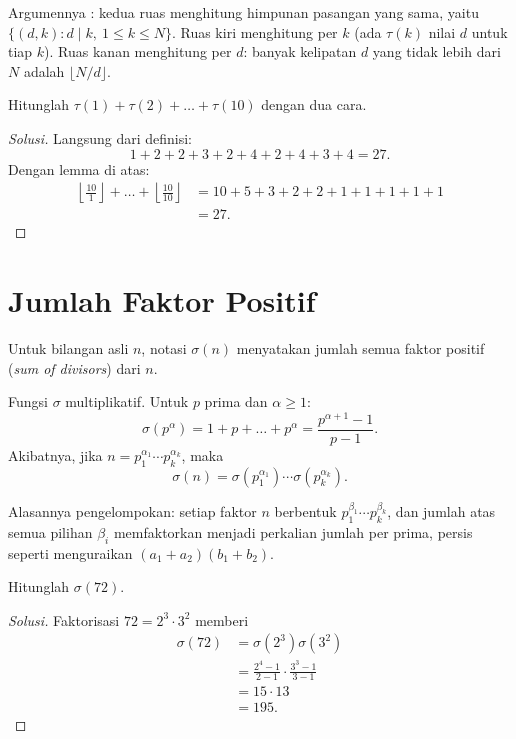 \documentclass[12pt]{scrartcl}
\begin{document}
Argumennya : kedua ruas menghitung
himpunan pasangan yang sama, yaitu $\{(d, k) : d \mid k,\ 1 \le k \le N\}$.
Ruas kiri menghitung per $k$ (ada $\tau(k)$ nilai $d$ untuk tiap $k$).
Ruas kanan menghitung per $d$: banyak kelipatan $d$ yang tidak lebih dari $N$
adalah $\lfloor N/d \rfloor$.

\begin{example}
Hitunglah $\tau(1) + \tau(2) + \dots + \tau(10)$ dengan dua cara.
\end{example}
\begin{proof}[Solusi]
Langsung dari definisi:
\[ 1 + 2 + 2 + 3 + 2 + 4 + 2 + 4 + 3 + 4 = 27. \]
Dengan lemma di atas:
\begin{align*}
\left\lfloor \frac{10}{1} \right\rfloor + \dots + \left\lfloor \frac{10}{10} \right\rfloor
&= 10 + 5 + 3 + 2 + 2 + 1 + 1 + 1 + 1 + 1 \\
&= 27.
\end{align*}
\end{proof}

\section{Jumlah Faktor Positif}

\begin{definition}
Untuk bilangan asli $n$, notasi $\sigma(n)$ menyatakan jumlah semua faktor
positif (\textit{sum of divisors}) dari $n$.
\end{definition}

\begin{theorem}
Fungsi $\sigma$ multiplikatif. Untuk $p$ prima dan $\alpha \ge 1$:
\[ \sigma(p^\alpha) = 1 + p + \dots + p^\alpha = \frac{p^{\alpha+1} - 1}{p - 1}. \]
Akibatnya, jika $n = p_1^{\alpha_1} \cdots p_k^{\alpha_k}$, maka
\[ \sigma(n) = \sigma(p_1^{\alpha_1}) \cdots \sigma(p_k^{\alpha_k}). \]
\end{theorem}

Alasannya pengelompokan: setiap faktor $n$ berbentuk $p_1^{\beta_1} \cdots p_k^{\beta_k}$,
dan jumlah atas semua pilihan $\beta_i$ memfaktorkan menjadi perkalian
jumlah per prima, persis seperti menguraikan $(a_1 + a_2)(b_1 + b_2)$.

\begin{example}
Hitunglah $\sigma(72)$.
\end{example}
\begin{proof}[Solusi]
Faktorisasi $72 = 2^3 \cdot 3^2$ memberi
\begin{align*}
\sigma(72) &= \sigma(2^3)\sigma(3^2) \\
&= \frac{2^4 - 1}{2 - 1} \cdot \frac{3^3 - 1}{3 - 1} \\
&= 15 \cdot 13 \\
&= 195.
\end{align*}
\end{proof}
\end{document}
